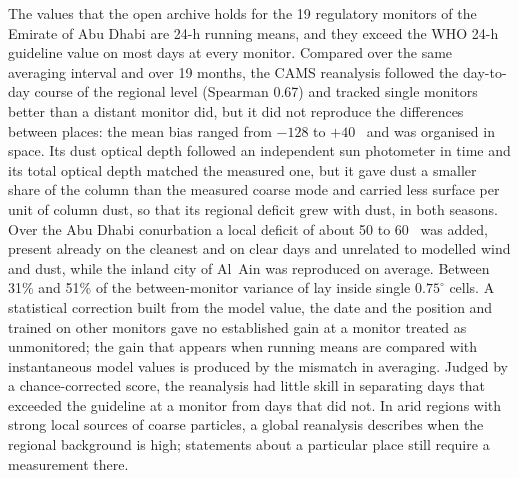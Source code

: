The \pmten{} values that the open archive holds for the 19 regulatory monitors of the Emirate of
Abu Dhabi are 24-h running means, and they exceed the WHO 24-h guideline value on most days at
every monitor. Compared over the same averaging interval and over 19 months, the CAMS reanalysis
followed the day-to-day course of the regional level (Spearman 0.67) and tracked single monitors
better than a distant monitor did, but it did not reproduce the differences between places: the
mean bias ranged from $-128$ to $+40$~\ugm{} and was organised in space. Its dust optical depth
followed an independent sun photometer in time and its total optical depth matched the measured
one, but it gave dust a smaller share of the column than the measured coarse mode and carried less
surface \pmten{} per unit of column dust, so that its regional deficit grew with dust, in both
seasons. Over the Abu Dhabi conurbation a local deficit of about 50 to 60~\ugm{} was added,
present already on the cleanest and on clear days and unrelated to modelled wind and dust, while the
inland city of Al~Ain was reproduced on average. Between 31\% and 51\% of the between-monitor variance of \pmten{} lay
inside single $0.75^{\circ}$ cells. A statistical correction built from the model value, the date and the position and trained on
other monitors gave no established gain at a monitor treated as unmonitored; the gain that appears when running means
are compared with instantaneous model values is produced by the mismatch in averaging. Judged by a chance-corrected score, the
reanalysis had little skill in separating days that exceeded the guideline at a monitor from days
that did not. In arid regions with strong local sources of coarse particles, a global reanalysis
describes when the regional background is high; statements about a particular place still require
a measurement there.
